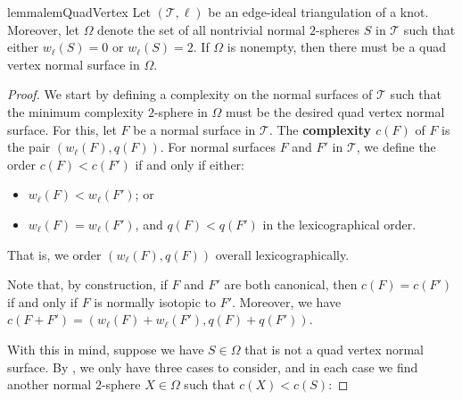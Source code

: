 \documentclass[a4paper,UKenglish,cleveref, autoref, thm-restate]{lipics-v2021}
\newcommand{\tri}{\mathcal{T}}
\begin{document}
\begin{restatable}{lemma}{lemQuadVertex}\label{lem:quadVertex}
Let $(\tri,\ell)$ be an edge-ideal triangulation of a knot.
Moreover, let $\Omega$ denote the set of all nontrivial normal $2$-spheres $S$ in $\tri$ such that either $w_\ell(S)=0$ or $w_\ell(S)=2$.
If $\Omega$ is nonempty, then there must be a quad vertex normal surface in $\Omega$.
\end{restatable}

\begin{proof}
We start by defining a complexity on the normal surfaces of $\tri$ such that the
minimum complexity $2$-sphere in $\Omega$ must be the desired quad vertex normal surface. For this, let $F$ be a normal surface in $\tri$. The \textbf{complexity $c(F)$} of $F$ is the pair $\left( w_\ell(F), q(F) \right)$. For normal surfaces $F$ and $F'$ in $\tri$, we define the order $c(F) < c(F')$ if and only if either:
\begin{itemize}
\item $w_\ell(F) < w_\ell(F')$; or
\item $w_\ell(F) = w_\ell(F')$, and $q(F) < q(F')$ in the lexicographical order.
\end{itemize}
That is, we order $\left( w_\ell(F), q(F) \right)$ overall lexicographically.

Note that, by construction, if $F$ and $F'$ are both canonical, then $c(F) = c(F')$ if and only if $F$ is normally isotopic to $F'$.
Moreover, we have $c(F+F') = \left( w_\ell(F) + w_\ell(F'), q(F) + q(F') \right)$.

With this in mind, suppose we have $S\in\Omega$ that is not a quad vertex normal surface.
By , we only have three cases to consider, and in each case we find another normal $2$-sphere $X\in\Omega$ such that $c(X)<c(S)$:


\end{proof}
\end{document}
